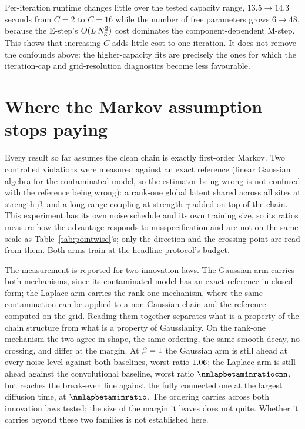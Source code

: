 Per-iteration runtime changes little over the tested capacity range,
$13.5\to14.3$ seconds from $C=2$ to $C=16$ while the number of free parameters
grows $6\to48$, because the E-step's $O(L\,N_{\mathrm{g}}^2)$ cost dominates the
component-dependent M-step. This shows that increasing $C$ adds little cost to
one iteration. It does not remove the confounds above: the higher-capacity fits
are precisely the ones for which the iteration-cap and grid-resolution
diagnostics become less favourable.


\section{Where the Markov assumption stops paying}\label{sec:em-nonmarkov}

Every result so far assumes the clean chain is exactly first-order Markov.
Two controlled violations were measured against an exact reference (linear
Gaussian algebra for the contaminated model, so the estimator being wrong is
not confused with the reference being wrong): a rank-one global latent
shared across all sites at strength $\beta$, and a long-range coupling at
strength $\gamma$ added on top of the chain. This experiment has its own noise
schedule and its own training size, so its ratios measure how the advantage
responds to misspecification and are not on the same scale as
Table~\ref{tab:pointwise}'s; only the direction and the crossing point are read
from them. Both arms train at the headline protocol's budget.

The measurement is reported for two innovation laws. The Gaussian arm carries
both mechanisms, since its contaminated model has an exact reference in closed
form; the Laplace arm carries the rank-one mechanism, where the same
contamination can be applied to a non-Gaussian chain and the reference computed
on the grid. Reading them together separates what is a property of the chain
structure from what is a property of Gaussianity. On the rank-one mechanism the
two agree in shape, the same ordering, the same smooth decay, no crossing, and differ at the margin. At $\beta = 1$ the Gaussian arm is still
ahead at every noise level against both baselines, worst ratio
$1.06$; the Laplace arm is still ahead against the convolutional
baseline, worst ratio $\nmlapbetaminratiocnn$, but reaches the break-even line
against the fully connected one at the largest diffusion time, at
$\nmlapbetaminratio$. The ordering carries across both innovation laws tested;
the size of the margin it leaves does not quite. Whether it carries beyond these
two families is not established here.

